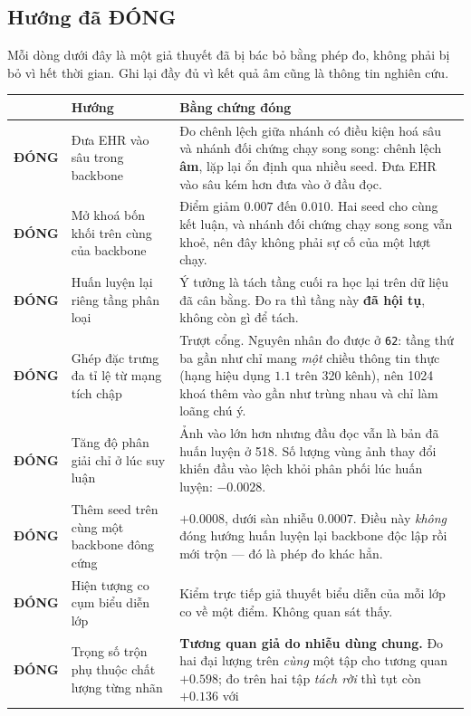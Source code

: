 \documentclass[11pt,a4paper]{article}
\newcommand{\DONG}{\textbf{\textcolor{red!62!black}{ĐÓNG}}}
\newcommand{\code}[1]{\texttt{\small #1}}
\begin{document}
\subsection{Hướng đã ĐÓNG}
\label{sec:closed}

Mỗi dòng dưới đây là một giả thuyết đã bị bác bỏ bằng phép đo, không phải bị bỏ vì hết
thời gian. Ghi lại đầy đủ vì kết quả âm cũng là thông tin nghiên cứu.

\begin{longtable}{@{}l p{4.5cm} p{9.2cm}@{}}
\toprule
& \textbf{Hướng} & \textbf{Bằng chứng đóng} \\
\midrule
\endhead
\DONG &Đưa EHR vào sâu trong backbone &
Đo chênh lệch giữa nhánh có điều kiện hoá sâu và nhánh đối chứng chạy song song: chênh
lệch \textbf{âm}, lặp lại ổn định qua nhiều seed. Đưa EHR vào sâu kém hơn đưa vào ở đầu đọc. \\
\addlinespace
\DONG &Mở khoá bốn khối trên cùng của backbone &
Điểm giảm $0.007$ đến $0.010$. Hai seed cho cùng kết luận, và nhánh đối chứng chạy song
song vẫn khoẻ, nên đây không phải sự cố của một lượt chạy. \\
\addlinespace
\DONG &Huấn luyện lại riêng tầng phân loại &
Ý tưởng là tách tầng cuối ra học lại trên dữ liệu đã cân bằng. Đo ra thì tầng này
\textbf{đã hội tụ}, không còn gì để tách. \\
\addlinespace
\DONG &Ghép đặc trưng đa tỉ lệ từ mạng tích chập &
Trượt cổng. Nguyên nhân đo được ở \code{62}: tầng thứ ba gần như chỉ mang \emph{một}
chiều thông tin thực (hạng hiệu dụng $1.1$ trên 320 kênh), nên 1024 khoá thêm vào gần
như trùng nhau và chỉ làm loãng chú ý. \\
\addlinespace
\DONG &Tăng độ phân giải chỉ ở lúc suy luận &
Ảnh vào lớn hơn nhưng đầu đọc vẫn là bản đã huấn luyện ở 518. Số lượng vùng ảnh thay đổi
khiến đầu vào lệch khỏi phân phối lúc huấn luyện: $-0.0028$. \\
\addlinespace
\DONG &Thêm seed trên cùng một backbone đông cứng &
$+0.0008$, dưới sàn nhiễu $0.0007$. Điều này \emph{không} đóng hướng huấn luyện lại
backbone độc lập rồi mới trộn --- đó là phép đo khác hẳn. \\
\addlinespace
\DONG &Hiện tượng co cụm biểu diễn lớp &
Kiểm trực tiếp giả thuyết biểu diễn của mỗi lớp co về một điểm. Không quan sát thấy. \\
\addlinespace
\DONG &Trọng số trộn phụ thuộc chất lượng từng nhãn &
\textbf{Tương quan giả do nhiễu dùng chung.} Đo hai đại lượng trên \emph{cùng} một tập
cho tương quan $+0.598$; đo trên hai tập \emph{tách rời} thì tụt còn $+0.136$ với

\end{longtable}
\end{document}
